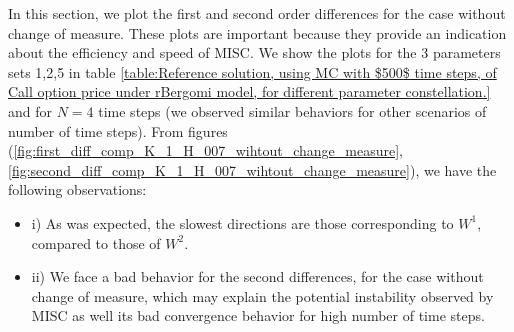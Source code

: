 \documentclass[11pt]{article}
\begin{document}
In this section, we plot the first and second order differences for the case without change of measure. These plots are important because they provide an indication about the efficiency and speed of MISC. We show the plots for the 3 parameters sets 1,2,5 in table \ref{table:Reference solution, using MC with $500$ time steps, of Call option price under rBergomi model, for different parameter constellation.}  and for  $N=4$ time steps (we observed similar behaviors for other scenarios of number of time steps). From figures (\ref{fig:first_diff_comp_K_1_H_007_wihtout_change_measure},\ref{fig:second_diff_comp_K_1_H_007_wihtout_change_measure}), we have the following observations:
\begin{itemize}
	\item i) As was expected, the slowest directions are those corresponding to $W^1$, compared to those of   $W^2$.
	
	\item ii)  We face a bad behavior for the second differences, for the case without change of measure, which may explain the potential instability observed by MISC as well its bad convergence behavior for high number of time steps. 
\end{itemize}
\end{document}
